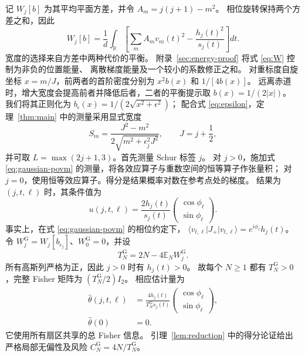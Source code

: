 \documentclass[aps,pra,reprint,superscriptaddress,longbibliography]{revtex4-2}
\theoremstyle{remark}
\newcommand{\E}{\mathbb E}
\newcommand{\R}{\mathbb R}
\newcommand{\ket}[1]{\lvert#1\rangle}
\newcommand{\bra}[1]{\langle#1\rvert}
\newcommand{\g}{\mathrm G}
\begin{document}
记 $W_j[b]$ 为其平均平面方差，并令 $A_m=j(j+1)-m^2$。
相位旋转保持两个方差之和，因此
\begin{equation}
 W_j[b]=\frac1d\int_\R
 \left[\sum_m A_m v_m(t)^2-\frac{h_j(t)^2}{s_j(t)}\right]dt.
 \label{eq:W}
\end{equation}
宽度的选择来自方差中两种代价的平衡。
附录~\ref{sec:energy-proof} 将式 \eqref{eq:W} 控制为非负的位置能量、
离散梯度能量及一个较小的系数修正之和。
对重标度自旋坐标 $x=m/J$，前两者的首阶密度分别为 $x^2b(x)$ 和 $1/[4b(x)]$。
远离赤道时，增大宽度会提高前者并降低后者，二者的平衡提示取 $b(x)=1/(2|x|)$。
我们将其正则化为 $b_\epsilon(x)=1/(2\sqrt{x^2+\epsilon^2})$；
配合式 \eqref{eq:epsilon}，定理~\ref{thm:main} 中的测量采用显式宽度
\begin{equation}
 S_m=\frac{J^2-m^2}{2\sqrt{m^2+\epsilon_j^2J^2}},\qquad
 J=j+\frac12,
 \label{eq:explicit-width}
\end{equation}
并可取 $L=\max(2j+1,3)$。首先测量 Schur 标签 $j$。
对 $j>0$，施加式 \eqref{eq:gaussian-povm} 的测量，将各效应算子与重数空间的恒等算子作张量积；
对 $j=0$，使用恒等效应算子。得分是结果概率对数在参考点处的梯度。
结果为 $(j,t,\ell)$ 时，其条件值为
\begin{equation}
 u(j,t,\ell)=\frac{2h_j(t)}{s_j(t)}
 \begin{pmatrix}\cos\phi_\ell\\ \sin\phi_\ell\end{pmatrix}.
 \label{eq:score}
\end{equation}
事实上，在式 \eqref{eq:gaussian-povm} 的相位约定下，
$\bra{v_{t,\ell}}J_+\ket{v_{t,\ell}}=e^{i\phi_\ell}h_j(t)$。
令 $W_j^{\g}=W_j[b_{\epsilon_j}]$、$W_0^{\g}=0$，并设
\begin{equation}
 T_N^{\g}=2N-4\E_NW_j^{\g}.
 \label{eq:TN}
\end{equation}
所有高斯列严格为正，因此 $j>0$ 时有 $h_j(t)>0$。
故每个 $N\geq1$ 都有 $T_N^{\g}>0$，完整 Fisher 矩阵为 $(T_N^{\g}/2)I_2$。
相应估计量为
\begin{equation}
\begin{aligned}
\widehat\theta(j,t,\ell)&=
\frac{4h_j(t)}{T_N^{\g}s_j(t)}
\begin{pmatrix}\cos\phi_\ell\\ \sin\phi_\ell\end{pmatrix},\\
\widehat\theta(0)&=0.
\end{aligned}
\label{eq:estimator}
\end{equation}
它使用所有扇区共享的总 Fisher 信息。
引理~\ref{lem:reduction} 中的得分论证给出严格局部无偏性及风险 $C_N^{\g}=4N/T_N^{\g}$。
\end{document}
